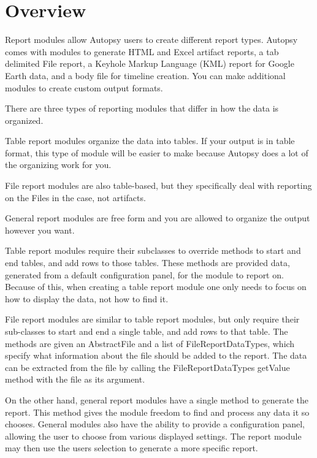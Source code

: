 \hypertarget{mod_report_page_report_summary}{}\section{Overview}\label{mod_report_page_report_summary}
Report modules allow Autopsy users to create different report types. Autopsy comes with modules to generate H\+T\+ML and Excel artifact reports, a tab delimited File report, a Keyhole Markup Language (K\+ML) report for Google Earth data, and a body file for timeline creation. You can make additional modules to create custom output formats.

There are three types of reporting modules that differ in how the data is organized.
\begin{DoxyItemize}
\item Table report modules organize the data into tables. If your output is in table format, this type of module will be easier to make because Autopsy does a lot of the organizing work for you.
\item File report modules are also table-\/based, but they specifically deal with reporting on the Files in the case, not artifacts.
\item General report modules are free form and you are allowed to organize the output however you want.
\end{DoxyItemize}

Table report modules require their subclasses to override methods to start and end tables, and add rows to those tables. These methods are provided data, generated from a default configuration panel, for the module to report on. Because of this, when creating a table report module one only needs to focus on how to display the data, not how to find it.

File report modules are similar to table report modules, but only require their sub-\/classes to start and end a single table, and add rows to that table. The methods are given an Abstract\+File and a list of File\+Report\+Data\+Types, which specify what information about the file should be added to the report. The data can be extracted from the file by calling the File\+Report\+Data\+Types get\+Value method with the file as it\textquotesingle{}s argument.

On the other hand, general report modules have a single method to generate the report. This method gives the module freedom to find and process any data it so chooses. General modules also have the ability to provide a configuration panel, allowing the user to choose from various displayed settings. The report module may then use the user\textquotesingle{}s selection to generate a more specific report.

